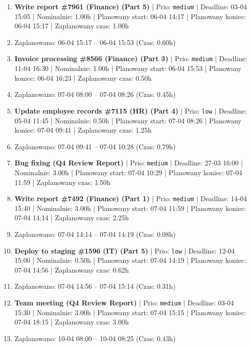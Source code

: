 {\begin{enumerate}
  \item [\textbf{14657}] \textbf{Write report \#7961 (Finance) (Part 5)} | Prio: \texttt{medium} | Deadline: 03-04 15:05 | Nominalnie: 1.00h | Planowany start: 06-04 14:17 | Planowany koniec: 06-04 15:17 | Zaplanowany czas: 1.00h
  \item [\textbf{PRZERWA}] Zaplanowano: 06-04 15:17 -- 06-04 15:53 (Czas: 0.60h)
  \item [\textbf{14675}] \textbf{Invoice processing \#8566 (Finance) (Part 3)} | Prio: \texttt{medium} | Deadline: 11-04 16:30 | Nominalnie: 1.00h | Planowany start: 06-04 15:53 | Planowany koniec: 06-04 16:23 | Zaplanowany czas: 0.50h
  \item [\textbf{PRZERWA}] Zaplanowano: 07-04 08:00 -- 07-04 08:26 (Czas: 0.45h)
  \item [\textbf{14701}] \textbf{Update employee records \#7115 (HR) (Part 4)} | Prio: \texttt{low} | Deadline: 05-04 11:45 | Nominalnie: 0.50h | Planowany start: 07-04 08:26 | Planowany koniec: 07-04 09:41 | Zaplanowany czas: 1.25h
  \item [\textbf{PRZERWA}] Zaplanowano: 07-04 09:41 -- 07-04 10:28 (Czas: 0.79h)
  \item [\textbf{14647}] \textbf{Bug fixing (Q4 Review Report)} | Prio: \texttt{medium} | Deadline: 27-03 16:00 | Nominalnie: 3.00h | Planowany start: 07-04 10:29 | Planowany koniec: 07-04 11:59 | Zaplanowany czas: 1.50h
  \item [\textbf{14642}] \textbf{Write report \#7492 (Finance) (Part 1)} | Prio: \texttt{medium} | Deadline: 14-04 15:40 | Nominalnie: 3.00h | Planowany start: 07-04 11:59 | Planowany koniec: 07-04 14:14 | Zaplanowany czas: 2.25h
  \item [\textbf{PRZERWA}] Zaplanowano: 07-04 14:14 -- 07-04 14:19 (Czas: 0.08h)
  \item [\textbf{14692}] \textbf{Deploy to staging \#1596 (IT) (Part 5)} | Prio: \texttt{low} | Deadline: 12-04 15:00 | Nominalnie: 0.50h | Planowany start: 07-04 14:19 | Planowany koniec: 07-04 14:56 | Zaplanowany czas: 0.62h
  \item [\textbf{PRZERWA}] Zaplanowano: 07-04 14:56 -- 07-04 15:14 (Czas: 0.31h)
  \item [\textbf{14635}] \textbf{Team meeting (Q4 Review Report)} | Prio: \texttt{medium} | Deadline: 03-04 15:30 | Nominalnie: 3.00h | Planowany start: 07-04 15:15 | Planowany koniec: 07-04 18:15 | Zaplanowany czas: 3.00h
  \item [\textbf{PRZERWA}] Zaplanowano: 10-04 08:00 -- 10-04 08:25 (Czas: 0.43h)

\end{enumerate}}
